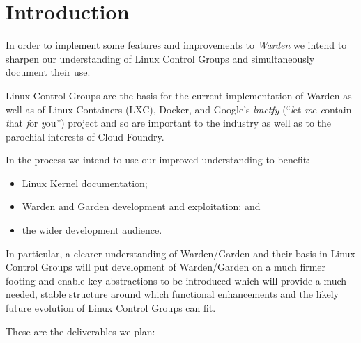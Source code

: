 \documentclass[a4paper,twoside,12pt]{article}
\begin{document}
\clearpage
{}

\section{Introduction}

In order to implement some features and improvements to \emph{Warden} we intend to sharpen our understanding of Linux Control Groups and simultaneously document their use.

Linux Control Groups are the basis for the current implementation of Warden as well as of Linux Containers (LXC), Docker, and Google's
\textit{lmctfy} (``\emph{l}et \emph{m}e \emph{c}ontain \emph{t}hat \emph{f}or \emph{y}ou'') project and so are important to the industry as well as to the parochial interests of Cloud
Foundry.

In the process we intend to use our improved understanding to benefit:
\begin{itemize}
\item Linux Kernel documentation;
\item Warden \cite{warden} and Garden \cite{garden} development and exploitation; and
\item the wider development audience.
\end{itemize}
In particular, a clearer understanding of Warden/Garden and their basis in Linux Control Groups will put development of Warden/Garden
on a much firmer footing and enable key abstractions to be introduced which will provide a much-needed, stable structure around which
functional enhancements and the likely future evolution of Linux Control Groups can fit.

These are the deliverables we plan:
\end{document}

